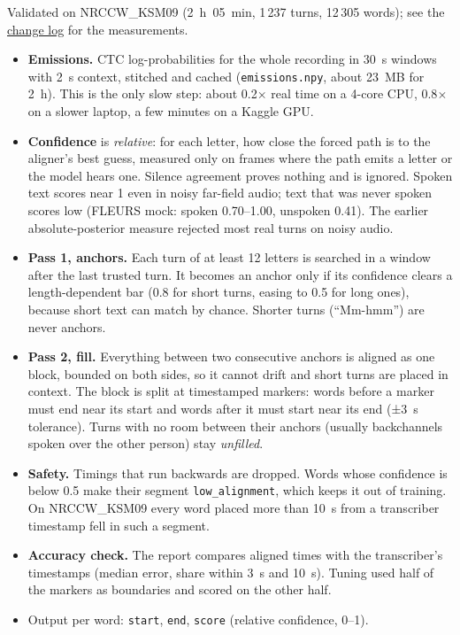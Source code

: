 \documentclass[11pt]{article}
\begin{document}
Validated on NRCCW\_KSM09 (2~h~05~min, 1\,237 turns, 12\,305 words); see the \hyperref[changelog]{change log} for the measurements.
\begin{itemize}
\tightlist
\item
  \textbf{Emissions.} CTC log-probabilities for the whole recording in 30~s windows with 2~s context, stitched and cached (\texttt{emissions.\allowbreak{}npy}, about 23~MB for 2~h). This is the only slow step: about 0.2$\times$ real time on a 4-core CPU, 0.8$\times$ on a slower laptop, a few minutes on a Kaggle GPU.
\item
  \textbf{Confidence} is \emph{relative}: for each letter, how close the forced path is to the aligner's best guess, measured only on frames where the path emits a letter or the model hears one. Silence agreement proves nothing and is ignored. Spoken text scores near 1 even in noisy far-field audio; text that was never spoken scores low (FLEURS mock: spoken 0.70--1.00, unspoken 0.41). The earlier absolute-posterior measure rejected most real turns on noisy audio.
\item
  \textbf{Pass 1, anchors.} Each turn of at least 12 letters is searched in a window after the last trusted turn. It becomes an anchor only if its confidence clears a length-dependent bar (0.8 for short turns, easing to 0.5 for long ones), because short text can match by chance. Shorter turns (``Mm-hmm'') are never anchors.
\item
  \textbf{Pass 2, fill.} Everything between two consecutive anchors is aligned as one block, bounded on both sides, so it cannot drift and short turns are placed in context. The block is split at timestamped markers: words before a marker must end near its start and words after it must start near its end (±3~s tolerance). Turns with no room between their anchors (usually backchannels spoken over the other person) stay \emph{unfilled}.
\item
  \textbf{Safety.} Timings that run backwards are dropped. Words whose confidence is below 0.5 make their segment \texttt{low\_\allowbreak{}alignment}, which keeps it out of training. On NRCCW\_KSM09 every word placed more than 10~s from a transcriber timestamp fell in such a segment.
\item
  \textbf{Accuracy check.} The report compares aligned times with the transcriber's timestamps (median error, share within 3~s and 10~s). Tuning used half of the markers as boundaries and scored on the other half.
\item
  Output per word: \texttt{start}, \texttt{end}, \texttt{score} (relative confidence, 0--1).
\end{itemize}
\end{document}
